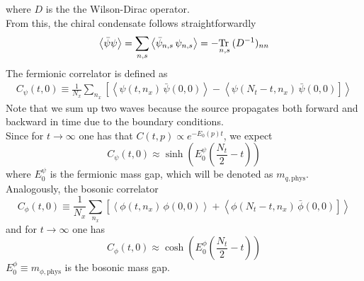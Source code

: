 where $D$ is the the Wilson-Dirac operator. \\
From this, the chiral condensate follows straightforwardly
\begin{equation*}
    \left\langle  \bar\psi \psi \right\rangle = \underset{n,s}\sum  \left\langle \bar\psi_{n,s} \, \psi_{n,s} \right\rangle = -\underset{n,s}{\operatorname{\text{Tr} \,}} \, (D^{-1})_{nn}
\end{equation*}
The fermionic correlator is defined as
\begin{align*}
    C_\psi(t,0) \equiv \frac{1}{N_x} \sum_{n_x} \left[\left\langle \psi(t, n_x) \, \bar\psi(0,0)\right\rangle - \left\langle \psi(N_t-t, n_x) \, \bar\psi(0,0) \right] \right\rangle
\end{align*}
Note that we sum up two waves because the source propagates both forward and backward in time due to the boundary conditions. \\
Since for $t \to \infty$ one has that $C(t,p) \propto e^{-E_0(p) t}$, we expect 
\begin{equation*}
    C_\psi(t,0) \approx \sinh \left(E_0^{\psi} \left(\frac{N_t}{2} - t\right)\right)
\end{equation*}
where $E_0^{\psi}$ is the fermionic mass gap, which will be denoted as $m_{q,\text{phys}}$. \\
Analogously, the bosonic correlator
\begin{equation*}
    C_\phi(t,0) \equiv \frac{1}{N_x} \sum_{n_x} \left[\left\langle \phi(t, n_x) \, \phi(0,0)\right\rangle + \left\langle \phi(N_t-t, n_x) \, \bar\phi(0,0) \right] \right\rangle
\end{equation*}
and for $t \to \infty$ one has 
\begin{equation*}
    C_\phi(t,0) \approx \cosh \left(E_0^{\phi} \left(\frac{N_t}{2} - t\right)\right)
\end{equation*}
$E_0^{\phi} \equiv m_{\phi, \text{phys}}$ is the bosonic mass gap.